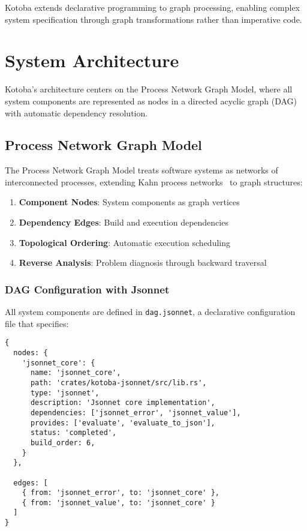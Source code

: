 \documentclass[11pt,a4paper]{article}
\begin{document}
Kotoba extends declarative programming to graph processing, enabling complex system specification through graph transformations rather than imperative code.

\section{System Architecture}
\label{sec:architecture}

Kotoba's architecture centers on the Process Network Graph Model, where all system components are represented as nodes in a directed acyclic graph (DAG) with automatic dependency resolution.

\subsection{Process Network Graph Model}
\label{subsec:process_model}

The Process Network Graph Model treats software systems as networks of interconnected processes, extending Kahn process networks~\cite{kahn1974} to graph structures:

\begin{enumerate}
\item \textbf{Component Nodes}: System components as graph vertices
\item \textbf{Dependency Edges}: Build and execution dependencies
\item \textbf{Topological Ordering}: Automatic execution scheduling
\item \textbf{Reverse Analysis}: Problem diagnosis through backward traversal
\end{enumerate}

\subsubsection{DAG Configuration with Jsonnet}
\label{subsubsec:dag_config}

All system components are defined in \texttt{dag.jsonnet}, a declarative configuration file that specifies:

\begin{lstlisting}[language=jsonnet,caption=Example dag.jsonnet configuration]
{
  nodes: {
    'jsonnet_core': {
      name: 'jsonnet_core',
      path: 'crates/kotoba-jsonnet/src/lib.rs',
      type: 'jsonnet',
      description: 'Jsonnet core implementation',
      dependencies: ['jsonnet_error', 'jsonnet_value'],
      provides: ['evaluate', 'evaluate_to_json'],
      status: 'completed',
      build_order: 6,
    }
  },

  edges: [
    { from: 'jsonnet_error', to: 'jsonnet_core' },
    { from: 'jsonnet_value', to: 'jsonnet_core' }
  ]
}
\end{lstlisting}
\end{document}
